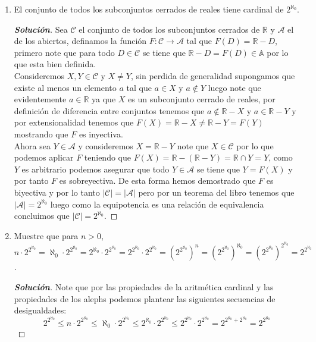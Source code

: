 \documentclass[11pt]{article}
\numberwithin{equation}{section}
\numberwithin{figure}{section}
\begin{document}
\begin{enumerate}
\begin{proof}[\textbf{Solución}]
   \end{proof}
   \item El conjunto de todos los subconjuntos cerrados de reales tiene cardinal de $2^{\aleph_0}$.
   \begin{proof}[\textbf{Solución}]
   Sea $\mathcal{C}$ el conjunto de todos los subconjuntos cerrados de $\mathbb{R}$ y $\mathcal{A}$ el de los abiertos, definamos la función $F:\mathcal{C}\longrightarrow\mathcal{A}$ tal que $F(D)=\mathbb{R}-D$, primero note que para todo $D\in\mathcal{C}$ se tiene que $\mathbb{R}-D=F(D)\in\mathbb{A}$ por lo que esta bien definida.\\
   Consideremos $X,Y\in\mathcal{C}$ y $X\neq Y$, sin perdida de generalidad supongamos que existe al menos un elemento $a$ tal que $a\in X$ y $a\notin Y$ luego note que evidentemente $a\in\mathbb{R}$ ya que $X$ es un subconjunto cerrado de reales, por definición de diferencia entre conjuntos tenemos que $a\notin\mathbb{R}-X$ y $a\in\mathbb{R}-Y$ y por extensionalidad tenemos que $F(X)=\mathbb{R}-X\neq\mathbb{R}-Y=F(Y)$ mostrando que $F$ es inyectiva.\\
   Ahora sea $Y\in\mathcal{A}$ y consideremos $X=\mathbb{R}-Y$ note que $X\in\mathcal{C}$ por lo que podemos aplicar $F$ teniendo que $F(X)=\mathbb{R}-(\mathbb{R}-Y)=\mathbb{R}\cap Y=Y$, como $Y$ es arbitrario podemos asegurar que todo $Y\in\mathcal{A}$ se tiene que $Y=F(X)$ y por tanto $F$ es sobreyectiva. De esta forma hemos demostrado que $F$ es biyectiva y por lo tanto $|\mathcal{C}|=|\mathcal{A}|$ pero por un teorema del libro tenemos que $|\mathcal{A}|=2^{\aleph_0}$ luego como la equipotencia es una relación de equivalencia concluimos que $|\mathcal{C}|=2^{\aleph_0}$.
   \end{proof}
   \item Muestre que para $n>0$, $n\cdot2^{2^{\aleph_0}}=\aleph_0\cdot2^{2^{\aleph_0}}=2^{\aleph_0}\cdot2^{2^{\aleph_0}}=2^{2^{\aleph_0}}\cdot2^{2^{\aleph_0}}=(2^{2^{\aleph_0}})^n=(2^{2^{\aleph_0}})^{\aleph_0}=(2^{2^{\aleph_0}})^{2^{\aleph_0}}=2^{2^{\aleph_0}}$.
   \begin{proof}[\textbf{Solución}]
    Note que por las propiedades de la aritmética cardinal y las propiedades de los alephs podemos plantear las siguientes secuencias de desigualdades:
    \begin{equation*}
    2^{2^{\aleph_0}}\leq n\cdot2^{2^{\aleph_0}}\leq\aleph_0\cdot2^{2^{\aleph_0}}\leq2^{\aleph_0}\cdot2^{2^{\aleph_0}}\leq2^{2^{\aleph_0}}\cdot2^{2^{\aleph_0}}=2^{2^{\aleph_0}+2^{\aleph_0}}=2^{2^{\aleph_0}}   
    \end{equation*}

\end{proof}
\end{enumerate}
\end{document}
